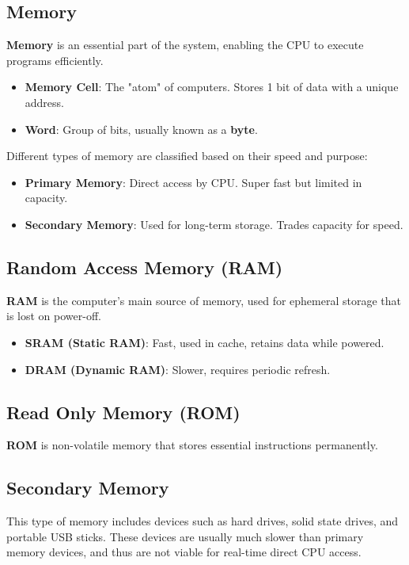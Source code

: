 \documentclass[12pt, letterpaper]{article}
\begin{document}
\subsection*{Memory}

\textbf{Memory} is an essential part of the system, enabling the CPU to execute programs efficiently.

\begin{itemize}
    \item \textbf{Memory Cell}: The "atom" of computers. Stores 1 bit of data with a unique address.
    \item \textbf{Word}: Group of bits, usually known as a \textbf{byte}.
\end{itemize}

Different types of memory are classified based on their speed and purpose:

\begin{itemize}
    \item \textbf{Primary Memory}: Direct access by CPU. Super fast but limited in capacity.
    \item \textbf{Secondary Memory}: Used for long-term storage. Trades capacity for speed.
\end{itemize}

\subsection*{Random Access Memory (RAM)}

\textbf{RAM} is the computer's main source of memory, used for ephemeral storage that is lost on power-off.

\begin{itemize}
    \item \textbf{SRAM (Static RAM)}: Fast, used in cache, retains data while powered.
    \item \textbf{DRAM (Dynamic RAM)}: Slower, requires periodic refresh.
\end{itemize}


\subsection*{Read Only Memory (ROM)}

\textbf{ROM} is non-volatile memory that stores essential instructions permanently.


\subsection*{Secondary Memory}

This type of memory includes devices such as hard drives, solid state drives, and portable USB sticks. These devices are usually much slower than primary memory devices, and thus are not viable for real-time direct CPU access.
\end{document}
